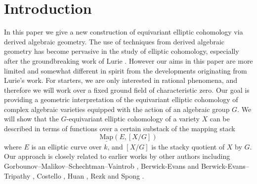 \documentclass[11pt,letterpaper]{amsart}
\newcommand{\Map}[2]{\underline{\mathrm{Map}}\left (#1,#2\right )}
\begin{document}
\section{Introduction}
In this paper we give a new construction of equivariant elliptic cohomology via derived algebraic geometry. The use of techniques from derived algebraic geometry has become pervasive in  the study of elliptic cohomology, especially after the groundbreaking work of Lurie \cite{ELL1, ELL2, ELL3}.  However our aims in this paper are more limited and somewhat different in spirit from the developments originating from Lurie's work. For starters, we are only interested in rational phenomena, and therefore we will work over a fixed ground field  of characteristic zero.   Our goal is providing a geometric interpretation of the   equivariant elliptic cohomology of complex algebraic varieties equipped with the action of an algebraic group $G$.    %
We will show that the $G$-equivariant elliptic cohomology of a variety $X$   can be described in terms of functions over a certain substack of the mapping stack 
 $$
\Map{E}{[X/G]}
$$ 
where $E$ is an elliptic curve over $k$, and $[X/G]$ is the stacky quotient of $X$ by   $G$. 
Our approach is closely related to earlier works by other authors including Gorbounov--Malikov--Schechtman--Vaintrob \cite{GMSV1} \cite{GMSV2} \cite{GMSV3} \cite{GMSV4}, Berwick-Evans \cite{BE1} and Berwick-Evans--Tripathy \cite{BETI}, Costello \cite{Cos1} \cite{Cos2}, Huan \cite{Huan18a}\cite{Huan18b}, Rezk \cite{Rez20} and Spong \cite{Spo}\cite{Spo19}\cite{Spo21}.
\end{document}
